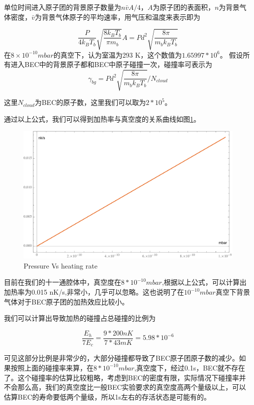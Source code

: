 \documentclass[onecolumn,a4paper,10pt,plain]{article}
\begin{document}
单位时间进入原子团的背景原子数量为$n\bar{v}A/4$，$A$为原子团的表面积，$n$为背景气体密度，$\bar{v}$为背景气体原子的平均速率，用气压和温度来表示即为

\begin{equation}
\frac{P}{4k_B T_b}\sqrt{\frac{8k_BT_b}{\pi m_b}} A=P d^2\sqrt{\frac{8\pi}{m_bk_BT_b}}
\end{equation}
在$8\times10^{-10} mbar$的真空下，认为室温为293 K，这个数值为$1.65997*10^6$。
假设所有进入BEC中的背景原子都和BEC中原子碰撞一次，碰撞率可表示为
\begin{equation}
\gamma_{bg}=P d^2\sqrt{\frac{8\pi}{m_bk_BT_b}}/N_{cloud}
\end{equation}

这里$N_{cloud}$为BEC的原子数，这里我们可以取为$2*10^5$。

通过以上公式，我们可以得到加热率与真空度的关系曲线如图\ref{fig:heating rate}。

\begin{figure}[htbp]
\centering
\includegraphics[width=1\textwidth]{heatingrate}
\caption{Pressure Vs heating rate}
\label{fig:heating rate}
\end{figure}

目前在我们的十一通腔体中，真空度在$8*10^{-10} mbar$,根据以上公式，可以计算出加热率为0.015 nK/s,非常小，几乎可以忽略。这也说明了在$10^{-10} mbar$真空下背景气体对于BEC原子团的加热效应比较小。

我们可以计算出导致加热的碰撞占总碰撞的比例为

\begin{equation}
\frac{E_h}{7E_c}=\frac{9*200 nK }{7*43 mK}=5.98*10^{-6}
\end{equation}

可见这部分比例是非常少的，大部分碰撞都导致了BEC原子团原子数的减少。如果按照上面的碰撞率来算，在$8*10^{-10} mbar$,真空度下，经过0.1s，BEC就不存在了。这个碰撞率的估算比较粗略，考虑到BEC的密度有限，实际情况下碰撞率并不会那么高，我们的真空度比一般BEC实验要求的真空度高两个量级以上，可以估算BEC的寿命要低两个量级，所以1s左右的存活状态是可能有的。
\end{document}

